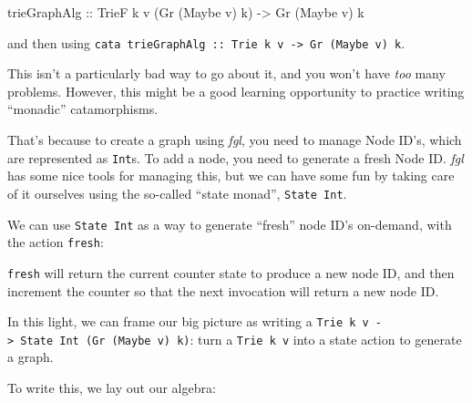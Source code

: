 \documentclass[]{article}
\newenvironment{Shaded}{}{}
\newcommand{\CommentTok}[1]{\textcolor[rgb]{0.38,0.63,0.69}{\textit{#1}}}
\newcommand{\DataTypeTok}[1]{\textcolor[rgb]{0.56,0.13,0.00}{#1}}
\newcommand{\DecValTok}[1]{\textcolor[rgb]{0.25,0.63,0.44}{#1}}
\newcommand{\NormalTok}[1]{#1}
\newcommand{\OperatorTok}[1]{\textcolor[rgb]{0.40,0.40,0.40}{#1}}
\newcommand{\OtherTok}[1]{\textcolor[rgb]{0.00,0.44,0.13}{#1}}
\begin{document}
\begin{Shaded}
\begin{Highlighting}[]
\NormalTok{trieGraphAlg}
\OtherTok{    ::} \DataTypeTok{TrieF}\NormalTok{ k v (}\DataTypeTok{Gr}\NormalTok{ (}\DataTypeTok{Maybe}\NormalTok{ v) k)}
    \OtherTok{{-}\textgreater{}} \DataTypeTok{Gr}\NormalTok{ (}\DataTypeTok{Maybe}\NormalTok{ v) k}
\end{Highlighting}
\end{Shaded}

and then using
\texttt{cata\ trieGraphAlg\ ::\ Trie\ k\ v\ -\textgreater{}\ Gr\ (Maybe\ v)\ k}.

This isn't a particularly bad way to go about it, and you won't have \emph{too}
many problems. However, this might be a good learning opportunity to practice
writing ``monadic'' catamorphisms.

That's because to create a graph using \emph{fgl}, you need to manage Node ID's,
which are represented as \texttt{Int}s. To add a node, you need to generate a
fresh Node ID. \emph{fgl} has some nice tools for managing this, but we can have
some fun by taking care of it ourselves using the so-called ``state monad'',
\texttt{State\ Int}.

We can use \texttt{State\ Int} as a way to generate ``fresh'' node ID's
on-demand, with the action \texttt{fresh}:

\begin{Shaded}
\end{Shaded}

\texttt{fresh} will return the current counter state to produce a new node ID,
and then increment the counter so that the next invocation will return a new
node ID.

In this light, we can frame our big picture as writing a
\texttt{Trie\ k\ v\ -\textgreater{}\ State\ Int\ (Gr\ (Maybe\ v)\ k)}: turn a
\texttt{Trie\ k\ v} into a state action to generate a graph.

To write this, we lay out our algebra:
\end{document}
